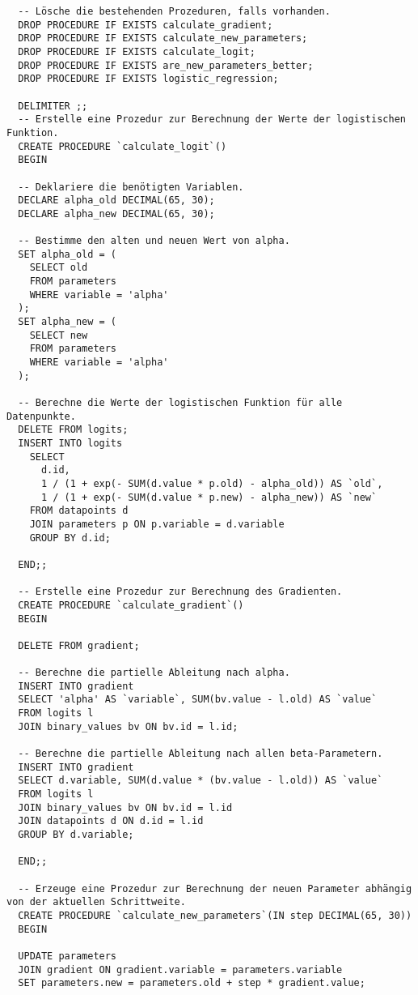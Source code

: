\begin{verbatim}
  -- Lösche die bestehenden Prozeduren, falls vorhanden.
  DROP PROCEDURE IF EXISTS calculate_gradient;
  DROP PROCEDURE IF EXISTS calculate_new_parameters;
  DROP PROCEDURE IF EXISTS calculate_logit;
  DROP PROCEDURE IF EXISTS are_new_parameters_better;
  DROP PROCEDURE IF EXISTS logistic_regression;

  DELIMITER ;;
  -- Erstelle eine Prozedur zur Berechnung der Werte der logistischen Funktion.
  CREATE PROCEDURE `calculate_logit`()
  BEGIN

  -- Deklariere die benötigten Variablen.
  DECLARE alpha_old DECIMAL(65, 30);
  DECLARE alpha_new DECIMAL(65, 30);

  -- Bestimme den alten und neuen Wert von alpha.
  SET alpha_old = (
    SELECT old
    FROM parameters
    WHERE variable = 'alpha'
  );
  SET alpha_new = (
    SELECT new
    FROM parameters
    WHERE variable = 'alpha'
  );

  -- Berechne die Werte der logistischen Funktion für alle Datenpunkte.
  DELETE FROM logits;
  INSERT INTO logits
    SELECT
      d.id,
      1 / (1 + exp(- SUM(d.value * p.old) - alpha_old)) AS `old`,
      1 / (1 + exp(- SUM(d.value * p.new) - alpha_new)) AS `new`
    FROM datapoints d
    JOIN parameters p ON p.variable = d.variable
    GROUP BY d.id;

  END;;

  -- Erstelle eine Prozedur zur Berechnung des Gradienten.
  CREATE PROCEDURE `calculate_gradient`()
  BEGIN

  DELETE FROM gradient;

  -- Berechne die partielle Ableitung nach alpha.
  INSERT INTO gradient
  SELECT 'alpha' AS `variable`, SUM(bv.value - l.old) AS `value`
  FROM logits l
  JOIN binary_values bv ON bv.id = l.id;

  -- Berechne die partielle Ableitung nach allen beta-Parametern.
  INSERT INTO gradient
  SELECT d.variable, SUM(d.value * (bv.value - l.old)) AS `value`
  FROM logits l
  JOIN binary_values bv ON bv.id = l.id
  JOIN datapoints d ON d.id = l.id
  GROUP BY d.variable;

  END;;

  -- Erzeuge eine Prozedur zur Berechnung der neuen Parameter abhängig von der aktuellen Schrittweite.
  CREATE PROCEDURE `calculate_new_parameters`(IN step DECIMAL(65, 30))
  BEGIN

  UPDATE parameters
  JOIN gradient ON gradient.variable = parameters.variable
  SET parameters.new = parameters.old + step * gradient.value;


\end{verbatim}
